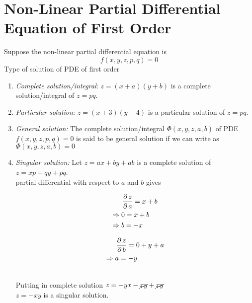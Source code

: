 \documentclass[../main-sheet.tex]{subfiles}
\begin{document}
\chapter{Non-Linear Partial Differential Equation of First Order}
Suppose the non-linear partial differential equation is 
\[
    f(x,y,z,p,q)=0
\]
Type of solution of PDE of first order
\begin{enumerate}
    \item \emph{Complete solution/integral}: \(z=(x+a)(y+b)\) is a complete solution/integral of \(z=pq\).
    \item \emph{Particular solution:} \(z=(x+3)(y-4)\) is a particular solution of \(z=pq\).
    \item \emph{General solution:} The complete solution/integral \(\Phi(x,y,z,a,b)\) of PDE \(f(x,y,z,p,q)=0\) is said to be general solution if we can write as \(\Phi(x,y,z,a,b)=0\)
    \item \emph{Singular solution:} Let \(z=ax+by+ab\) is a complete solution of \(z=xp+qy+pq\).\\
    partial differential with respect to \(a\) and \(b\) gives\\
    \noindent\begin{minipage}{.45\linewidth}
        \begin{align*}
            &\,\frac{\partial\, z}{\partial\, a}=x+b\\
            \Rightarrow\;&0=x+b\\
            \Rightarrow\;&b=-x
        \end{align*}
        \end{minipage}%
        \hfill\vline\hfill%
        \begin{minipage}{.45\linewidth}
        \begin{align*}
            &\,\frac{\partial\, z}{\partial\, b}=0+y+a\\
            \Rightarrow\;&a=-y
        \end{align*}
        \end{minipage}\\
        Putting in complete solution \(z=-yx-\cancel{xy}+\cancel{xy}\)\\
        \(z=-xy\) is a singular solution.
\end{enumerate}
\end{document}
